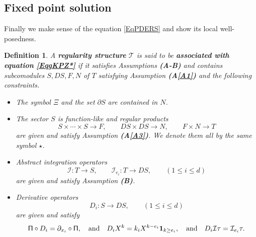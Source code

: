 \documentclass[10pt, reqno]{amsart}
\numberwithin{subsection}{section}
\numberwithin{subsubsection}{subsection}
\numberwithin{equation}{section} %
\theoremstyle{mystyle}
\theoremstyle{mystyle2}
\newtheorem*{defn*} {Definition}
\theoremstyle{mystyle3}
\newcommand{\refA}[1]{\textbf{\textsf{(A\ref{#1})}}}
\newcommand{\REFB}{\textbf{\textsf{(B)}}}
\newcommand{\mcI}{\mathcal{I}}
\begin{document}
\bigskip



\subsection{Fixed point solution}
\label{SubsectionFixedPoint}

Finally we make sense of the equation \eqref{EqPDERS} and show its local well-posedness.

\medskip

\begin{defn*}
A \textbf{\textsf{regularity structure}} $\mathscr{T}$ is said to be \textbf{\textsf{associated with equation \eqref{EqgKPZ*}}} if it satisfies Assumptions \textbf{\textsf{(A-B)}} and contains subcomodules $S, DS, F, N$ of $T$ satisfying Assumption \refA{A1} and the following constraints. 
\begin{itemize}
\setlength{\itemsep}{0.1cm}
	\item The symbol $\Xi$ and the set $\partial S$ are contained in $N$.
	
	\item The sector $S$ is function-like and regular products
$$
S\times\cdots\times S\to F,\qquad DS\times DS\to N,\qquad F\times N\to T
$$
are given and satisfy Assumption \refA{A3}. We denote them all by the same symbol $\star$.
	
	\item Abstract integration operators
$$
\mcI:T\to S,\qquad \mcI_{e_i}:T\to DS,\qquad (1\leq i\leq d)
$$
are given and satisfy Assumption \REFB.
	
	\item Derivative operators
$$
D_i:S\to DS, \qquad (1\leq i\leq d)
$$
are given and satisfy 
$$
{\sf \Pi}\circ D_i = \partial_{x_i}\circ{\sf \Pi}, \quad\textrm{and}\quad D_iX^k = k_iX^{k-e_i}{\bf1}_{k\ge e_i},\quad\text{and}\quad D_i\mcI\tau=\mcI_{e_i}\tau.
$$
\end{itemize}
\end{defn*}


\medskip
\end{document}
